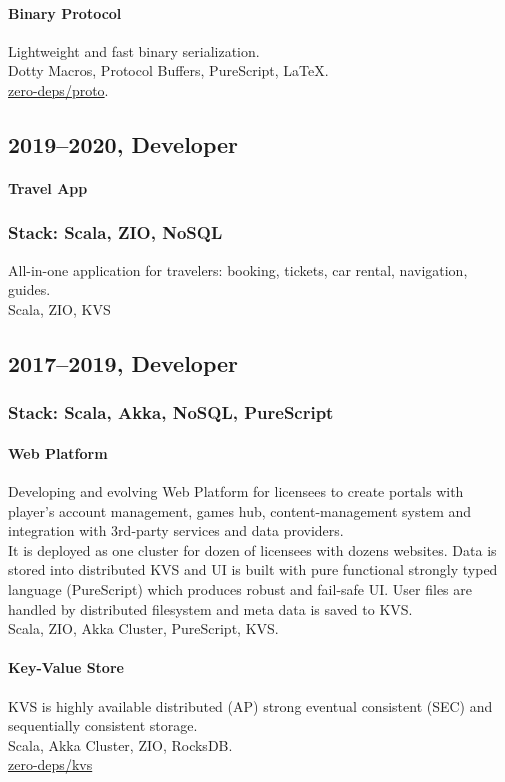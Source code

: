 \paragraph{Binary Protocol}
Lightweight and fast binary serialization.\\
Dotty Macros, Protocol Buffers, PureScript, LaTeX.\\
\href{https://github.com/zero-deps/proto}{zero-deps/proto}.

\subsection*{2019–2020, Developer}

\paragraph{Travel App}
\subsubsection*{Stack: Scala, ZIO, NoSQL}
All-in-one application for travelers: booking, tickets, car rental, navigation, guides.\\
Scala, ZIO, KVS

\subsection*{2017–2019, Developer}
\subsubsection*{Stack: Scala, Akka, NoSQL, PureScript}

\paragraph{Web Platform}
Developing and evolving Web Platform for licensees to create portals with player's account management, games hub, content-management system and integration with 3rd-party services and data providers.\\
It is deployed as one cluster for dozen of licensees with dozens websites. Data is stored into distributed KVS and UI is built with pure functional strongly typed language (PureScript) which produces robust and fail-safe UI. User files are handled by distributed filesystem and meta data is saved to KVS.\\
Scala, ZIO, Akka Cluster, PureScript, KVS.

\paragraph{Key-Value Store}
KVS is highly available distributed (AP) strong eventual consistent (SEC) and sequentially consistent storage.\\
Scala, Akka Cluster, ZIO, RocksDB.\\
\href{https://github.com/zero-deps/kvs}{zero-deps/kvs}

